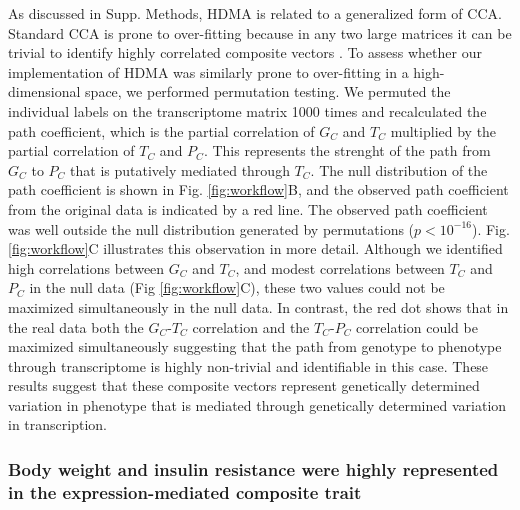 \documentclass[
]{article}
\begin{document}
As discussed in Supp. Methods, HDMA is related to a generalized form of
CCA. Standard CCA is prone to over-fitting because in any two large
matrices it can be trivial to identify highly correlated composite
vectors \cite{pmid38383808}. To assess whether our implementation of
HDMA was similarly prone to over-fitting in a high-dimensional space, we
performed permutation testing. We permuted the individual labels on the
transcriptome matrix 1000 times and recalculated the path coefficient,
which is the partial correlation of \(G_C\) and \(T_C\) multiplied by
the partial correlation of \(T_C\) and \(P_C\). This represents the
strenght of the path from \(G_C\) to \(P_C\) that is putatively mediated
through \(T_C\). The null distribution of the path coefficient is shown
in Fig. \ref{fig:workflow}B, and the observed path coefficient from the
original data is indicated by a red line. The observed path coefficient
was well outside the null distribution generated by permutations
(\(p < 10^{-16}\)). Fig. \ref{fig:workflow}C illustrates this
observation in more detail. Although we identified high correlations
between \(G_C\) and \(T_C\), and modest correlations between \(T_C\) and
\(P_C\) in the null data (Fig \ref{fig:workflow}C), these two values
could not be maximized simultaneously in the null data. In contrast, the
red dot shows that in the real data both the \(G_C\)-\(T_C\) correlation
and the \(T_C\)-\(P_C\) correlation could be maximized simultaneously
suggesting that the path from genotype to phenotype through
transcriptome is highly non-trivial and identifiable in this case. These
results suggest that these composite vectors represent genetically
determined variation in phenotype that is mediated through genetically
determined variation in transcription.

\subsubsection{Body weight and insulin resistance were highly
represented in the expression-mediated composite
trait}\label{body-weight-and-insulin-resistance-were-highly-represented-in-the-expression-mediated-composite-trait}
\end{document}
